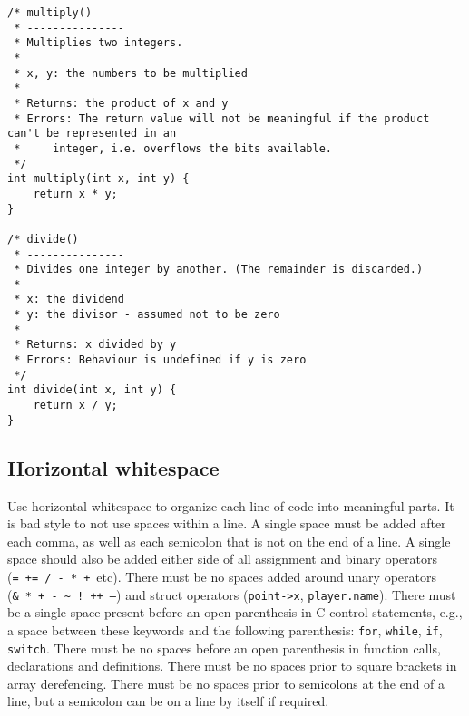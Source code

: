 \documentclass{article}
\newcommand{\propertilde}{\nolinkurl{~}}
\begin{document}
\begin{lstlisting}
/* multiply()
 * ---------------
 * Multiplies two integers.
 *
 * x, y: the numbers to be multiplied
 *
 * Returns: the product of x and y
 * Errors: The return value will not be meaningful if the product can't be represented in an 
 *     integer, i.e. overflows the bits available.
 */
int multiply(int x, int y) {
    return x * y;
}

/* divide()
 * ---------------
 * Divides one integer by another. (The remainder is discarded.)
 *
 * x: the dividend
 * y: the divisor - assumed not to be zero
 *
 * Returns: x divided by y 
 * Errors: Behaviour is undefined if y is zero
 */
int divide(int x, int y) {
    return x / y;
}
\end{lstlisting}

\subsection{Horizontal whitespace}
Use horizontal whitespace to organize each line of code into meaningful parts.
It is bad style to not use spaces within a line.
A single space must be added after each comma, as well as each semicolon that is not on the end of a line.
A single space should also be added either side of all assignment and binary operators (\texttt{=~+=~/~-~*~+}~etc).
There must be no spaces added around unary operators (\texttt{\&~*~+~-~\propertilde~!~++~--}) and struct operators (\texttt{point->x}, \texttt{player.name}). There must be a single space present before an open parenthesis in C control statements, e.g., a space between these keywords and the following parenthesis: \texttt{for}, \texttt{while}, 
\texttt{if}, \texttt{switch}. There must be no spaces before an open parenthesis in function calls, declarations and 
definitions. There must be no spaces prior to square brackets in array derefencing. There must be no spaces 
prior to semicolons at the end of a line, but a semicolon can be on a line by itself if required. 
\end{document}
